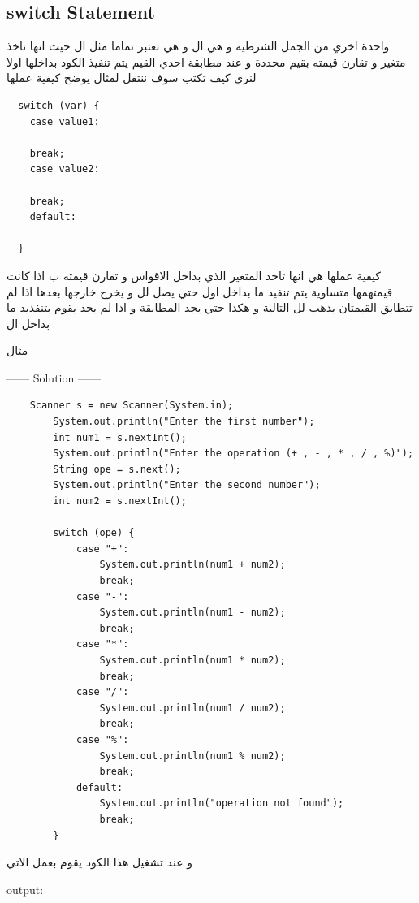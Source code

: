 \subsection{switch Statement}
\begin{AR}
  واحدة اخري من الجمل الشرطية و هي ال  و هي تعتبر تماما مثل ال  حيث انها تاخذ متغير و تقارن قيمته بقيم محددة و عند مطابقة احدي القيم يتم تنفيذ الكود بداخلها
  اولا لنري كيف تكتب سوف ننتقل لمثال يوضح كيفية عملها 
\end{AR}
\begin{verbatim}
  switch (var) {
    case value1:

    break;
    case value2:

    break;
    default:

  }
\end{verbatim}
\begin{AR}
  كيفية عملها هي انها تاخد المتغير الذي بداخل الاقواس  و تقارن قيمته ب  اذا كانت قيمتهمها متساوية يتم تنفيد ما بداخل 
  اول  حتي يصل لل  و يخرج خارجها بعدها اذا لم تتطابق القيمتان يذهب لل  التالية و هكذا 
  حتي يجد المطابقة و اذا لم يجد يقوم بتنفذيد ما بداخل ال 
  \par
  مثال
\end{AR}
\begin{minipage}[h]{1\textwidth}
\begin{example}
  
  \begin{center}
    ------ \textcolor{Solution}{Solution} ------ 
  \end{center} 

  \begin{verbatim}
    Scanner s = new Scanner(System.in);
        System.out.println("Enter the first number");
        int num1 = s.nextInt();
        System.out.println("Enter the operation (+ , - , * , / , %)");
        String ope = s.next();
        System.out.println("Enter the second number");
        int num2 = s.nextInt();

        switch (ope) {
            case "+":
                System.out.println(num1 + num2);
                break;
            case "-":
                System.out.println(num1 - num2);
                break;
            case "*":
                System.out.println(num1 * num2);
                break;
            case "/":
                System.out.println(num1 / num2);
                break;
            case "%":
                System.out.println(num1 % num2);
                break;
            default:
                System.out.println("operation not found");
                break;
        }

  \end{verbatim}
\end{example}
\end{minipage}
\newpage
\begin{AR}
  و عند تشغيل هذا الكود يقوم بعمل الاتي
\end{AR}
output:

